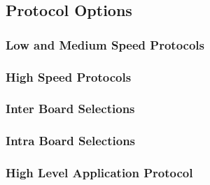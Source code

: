 \subsection{Protocol Options}
\subsubsection{Low and Medium Speed Protocols}
\subsubsection{High Speed Protocols}
\subsubsection{Inter Board Selections}
\subsubsection{Intra Board Selections}
\subsubsection{High Level Application Protocol}

